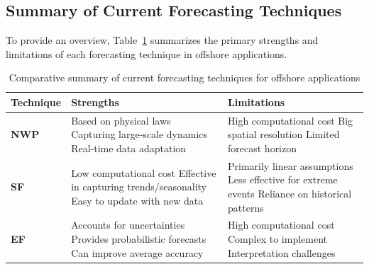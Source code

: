 \subsection{Summary of Current Forecasting Techniques}
To provide an overview, Table~\ref{tab:forecasting_summary} summarizes the primary strengths and limitations of each forecasting technique in offshore applications.

\begin{table}[h!]
\centering
\caption{Comparative summary of current forecasting techniques for offshore applications}
\label{tab:forecasting_summary}
\begin{tabular}{|p{2cm}|p{6.3cm}|p{6cm}|}
\hline
\centering \textbf{Technique} & \textbf{Strengths} & \textbf{Limitations} 
\\ \hline 
\vspace{5pt}
\centering\textbf{NWP} & 
Based on physical laws\newline
Capturing large-scale dynamics\newline
Real-time data adaptation
& 
High computational cost\newline
Big spatial resolution\newline
Limited forecast horizon
\\ \hline
\vspace{5pt}
\centering\textbf{SF} &
Low computational cost\newline
Effective in capturing trends/seasonality\newline
Easy to update with new data
&
Primarily linear assumptions\newline
Less effective for extreme events\newline
Reliance on historical patterns
\\ \hline
\vspace{5pt}
\centering\textbf{EF} &
Accounts for uncertainties\newline
Provides probabilistic forecasts\newline
Can improve average accuracy
&
High computational cost\newline
Complex to implement\newline
Interpretation challenges
\\ \hline
\end{tabular}
\end{table}

